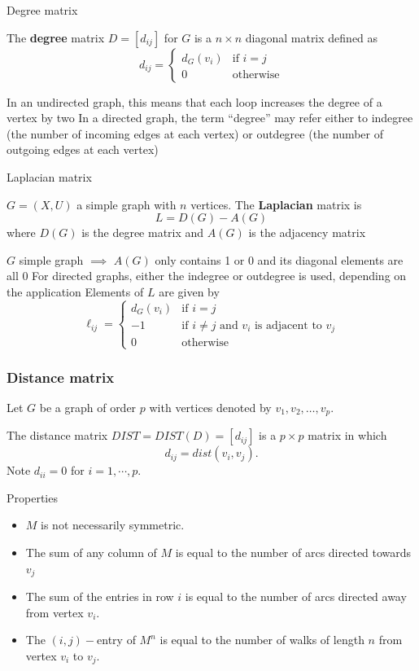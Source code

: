 \documentclass[aspectratio=169]{beamer}
\begin{document}
\begin{frame}{Degree matrix}
	\begin{definition}
		The \textbf{degree} matrix $D=[d_{ij}]$ for $G$ is a $n \times n$ diagonal matrix defined as
		\[
			d_{ij} = \begin{cases}
				d_G(v_i) & \text{if } i = j \\
				0 & \text{otherwise}
			\end{cases}
		\]
	\end{definition}
\vfill
In an undirected graph, this means that each loop increases the degree of a vertex by two
\vfill
In a directed graph, the term ``degree'' may refer either to indegree (the number of incoming edges at each vertex) or outdegree (the number of outgoing edges at each vertex)
\end{frame}

\begin{frame}{Laplacian matrix}
\begin{definition}
	$G=(X,U)$ a simple graph with $n$ vertices. The \textbf{Laplacian} matrix is 
	\[
		L=D(G)-A(G)
	\]
	where $D(G)$ is the degree matrix and $A(G)$ is the adjacency matrix
\end{definition}
$G$ simple graph $\implies$ $A(G)$ only contains 1 or 0 and its diagonal elements are all 0
\vfill
For directed graphs, either the indegree or outdegree is used, depending on the application
\vfill
Elements of $L$ are given by
\[
\ell_{ij}=\begin{cases}
	d_G(v_{i}) & \text{if } i=j\\
	-1 & \text{if } i\neq j \text{ and } v_{i} 
	\text{ is adjacent to }v_{j}\\
	0 & \text{otherwise}
\end{cases}
\]
\end{frame}


\begin{frame}\frametitle{Distance matrix}
	Let $G$ be a graph of order $p$ with vertices denoted by $v_1, v_2, \dots , v_p$.
	\begin{definition}
	The distance matrix $DIST=DIST(D)=[d_{ij}]$ is a $p\times p$ matrix in which
	$$d_{ij}=
	dist(v_i,v_j).
	$$
	Note $d_{ii}=0$ for $i=1,\cdots, p$.
	\end{definition}

	\begin{definition}{Properties}
		\begin{itemize}
		\item $M$ is not necessarily symmetric.
		\item The sum of any column of $M$ is equal to the number of arcs directed towards $v_j$
		\item The sum of the entries in row $i$ is equal to the number of arcs directed away from vertex $v_i$.
		\item The $(i,j)-$entry of $M^n$ is equal to the number of walks of length $n$ from vertex $v_i$ to $v_j$.
		\end{itemize}
	\end{definition}
\end{frame}
\end{document}
